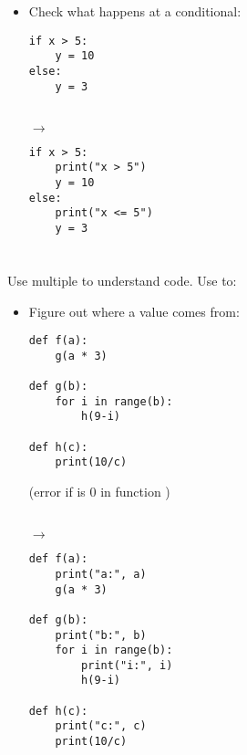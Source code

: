 \documentclass{handout}
\begin{document}
\begin{itemize}
\item Check what happens at a conditional: \\
\noindent
\begin{minipage}[t]{0.45\columnwidth}
\begin{lstlisting}
if x > 5:
    y = 10
else:
    y = 3
\end{lstlisting}
\end{minipage}
\begin{minipage}[t]{0.05\columnwidth}
\  \\
\hspace*{1ex}$\rightarrow$
\end{minipage}
\begin{minipage}[t]{0.45\columnwidth}
\begin{lstlisting}
if x > 5:
    print("x > 5")
    y = 10
else:
    print("x <= 5")
    y = 3
\end{lstlisting}
\end{minipage}


\end{itemize}

\section{}

Use multiple  to understand code. Use to:

\begin{itemize}

\item Figure out where a value comes from: \\
\noindent
\begin{minipage}[t]{0.45\columnwidth}
\begin{lstlisting}
def f(a):
    g(a * 3)

def g(b):
    for i in range(b):
        h(9-i)

def h(c):
    print(10/c)
\end{lstlisting}
(error if  is 0 in function )
\end{minipage}
\begin{minipage}[t]{0.05\columnwidth}
\  \\
\hspace*{1ex}$\rightarrow$
\end{minipage}
\begin{minipage}[t]{0.45\columnwidth}
\begin{lstlisting}
def f(a):
    print("a:", a)
    g(a * 3)

def g(b):
    print("b:", b)
    for i in range(b):
        print("i:", i)
        h(9-i)

def h(c):
    print("c:", c)
    print(10/c)
\end{lstlisting}
\end{minipage}


\end{itemize}
\end{document}
